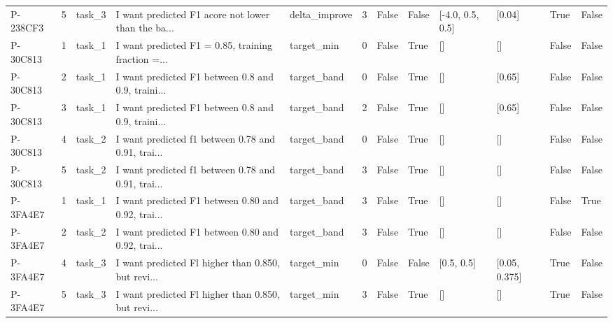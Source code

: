 \begin{tabular}{lrlllrllllll}
   P-238CF3 &        5 & task\_3 & I want predicted F1 acore not lower than the ba... & delta\_improve &          3 &          False &                 False & [-4.0, 0.5, 0.5] &         [0.04] &               True &            False \\
   P-30C813 &        1 & task\_1 & I want predicted F1 = 0.85, training fraction =... &    target\_min &          0 &          False &                  True &               [] &             [] &              False &            False \\
   P-30C813 &        2 & task\_1 & I want predicted F1 between 0.8 and 0.9, traini... &   target\_band &          0 &          False &                  True &               [] &         [0.65] &              False &            False \\
   P-30C813 &        3 & task\_1 & I want predicted F1 between 0.8 and 0.9, traini... &   target\_band &          2 &          False &                  True &               [] &         [0.65] &              False &            False \\
   P-30C813 &        4 & task\_2 & I want predicted f1 between 0.78 and 0.91, trai... &   target\_band &          0 &          False &                  True &               [] &             [] &              False &            False \\
   P-30C813 &        5 & task\_2 & I want predicted f1 between 0.78 and 0.91, trai... &   target\_band &          3 &          False &                  True &               [] &             [] &              False &            False \\
   P-3FA4E7 &        1 & task\_1 & I want predicted F1 between 0.80 and 0.92, trai... &   target\_band &          3 &          False &                  True &               [] &             [] &              False &             True \\
   P-3FA4E7 &        2 & task\_2 & I want predicted F1 between 0.80 and 0.92, trai... &   target\_band &          3 &          False &                  True &               [] &             [] &              False &            False \\
   P-3FA4E7 &        4 & task\_3 & I want predicted Fl higher than 0.850, but revi... &    target\_min &          0 &          False &                 False &       [0.5, 0.5] &  [0.05, 0.375] &               True &            False \\
   P-3FA4E7 &        5 & task\_3 & I want predicted Fl higher than 0.850, but revi... &    target\_min &          3 &          False &                  True &               [] &             [] &               True &            False \\

\end{tabular}
